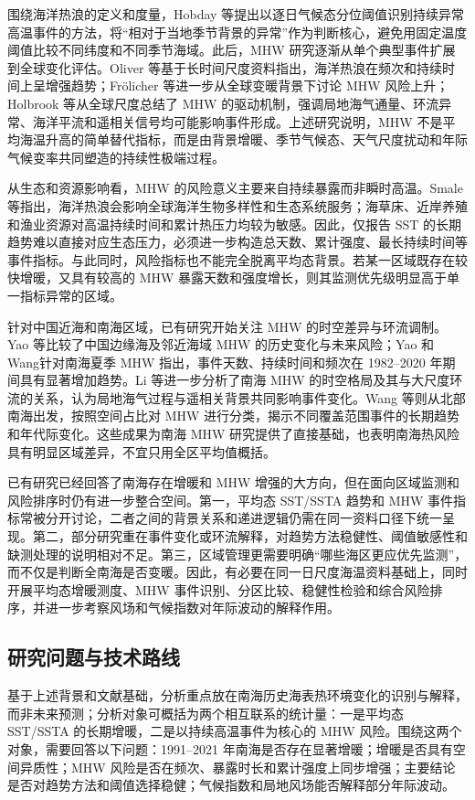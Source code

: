 \documentclass[UTF8,a4paper,zihao=-4,fontset=fandol]{ctexart}
\begin{document}
围绕海洋热浪的定义和度量，Hobday 等\cite{hobday2016mhw}提出以逐日气候态分位阈值识别持续异常高温事件的方法，将“相对于当地季节背景的异常”作为判断核心，避免用固定温度阈值比较不同纬度和不同季节海域。此后，MHW 研究逐渐从单个典型事件扩展到全球变化评估。Oliver 等\cite{oliver2018longer}基于长时间尺度资料指出，海洋热浪在频次和持续时间上呈增强趋势；Fr{\"o}licher 等\cite{frolicher2018mhw}进一步从全球变暖背景下讨论 MHW 风险上升；Holbrook 等\cite{holbrook2019mhw}从全球尺度总结了 MHW 的驱动机制，强调局地海气通量、环流异常、海洋平流和遥相关信号均可能影响事件形成。上述研究说明，MHW 不是平均海温升高的简单替代指标，而是由背景增暖、季节气候态、天气尺度扰动和年际气候变率共同塑造的持续性极端过程。

从生态和资源影响看，MHW 的风险意义主要来自持续暴露而非瞬时高温。Smale 等\cite{smale2019mhw}指出，海洋热浪会影响全球海洋生物多样性和生态系统服务；海草床、近岸养殖和渔业资源对高温持续时间和累计热压力均较为敏感。因此，仅报告 SST 的长期趋势难以直接对应生态压力，必须进一步构造总天数、累计强度、最长持续时间等事件指标。与此同时，风险指标也不能完全脱离平均态背景。若某一区域既存在较快增暖，又具有较高的 MHW 暴露天数和强度增长，则其监测优先级明显高于单一指标异常的区域。

针对中国近海和南海区域，已有研究开始关注 MHW 的时空差异与环流调制。Yao 等\cite{yao2020china}比较了中国边缘海及邻近海域 MHW 的历史变化与未来风险；Yao 和 Wang\cite{yao2021summer}针对南海夏季 MHW 指出，事件天数、持续时间和频次在 1982--2020 年期间具有显著增加趋势。Li 等\cite{li2022scs}进一步分析了南海 MHW 的时空格局及其与大尺度环流的关系，认为局地海气过程与遥相关背景共同影响事件变化。Wang 等\cite{wang2022nscs}则从北部南海出发，按照空间占比对 MHW 进行分类，揭示不同覆盖范围事件的长期趋势和年代际变化。这些成果为南海 MHW 研究提供了直接基础，也表明南海热风险具有明显区域差异，不宜只用全区平均值概括。

已有研究已经回答了南海存在增暖和 MHW 增强的大方向，但在面向区域监测和风险排序时仍有进一步整合空间。第一，平均态 SST/SSTA 趋势和 MHW 事件指标常被分开讨论，二者之间的背景关系和递进逻辑仍需在同一资料口径下统一呈现。第二，部分研究重在事件变化或环流解释，对趋势方法稳健性、阈值敏感性和缺测处理的说明相对不足。第三，区域管理更需要明确“哪些海区更应优先监测”，而不仅是判断全南海是否变暖。因此，有必要在同一日尺度海温资料基础上，同时开展平均态增暖测度、MHW 事件识别、分区比较、稳健性检验和综合风险排序，并进一步考察风场和气候指数对年际波动的解释作用。

\subsection{研究问题与技术路线}
基于上述背景和文献基础，分析重点放在南海历史海表热环境变化的识别与解释，而非未来预测；分析对象可概括为两个相互联系的统计量：一是平均态 SST/SSTA 的长期增暖，二是以持续高温事件为核心的 MHW 风险。围绕这两个对象，需要回答以下问题：1991--2021 年南海是否存在显著增暖；增暖是否具有空间异质性；MHW 风险是否在频次、暴露时长和累计强度上同步增强；主要结论是否对趋势方法和阈值选择稳健；气候指数和局地风场能否解释部分年际波动。
\end{document}
